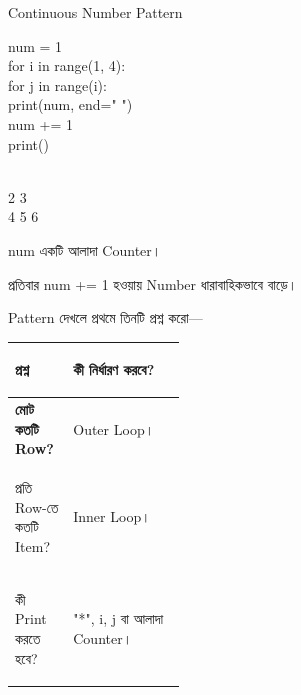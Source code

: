 \begin{codeoutputbox}{Continuous Number Pattern}

\noindent
\begin{minipage}[t]{0.55\linewidth}
\codeheading

\begin{english}
\ttfamily
num = 1\\
for i in range(1, 4):\\
\hspace*{4mm}for j in range(i):\\
\hspace*{8mm}print(num, end=" ")\\
\hspace*{8mm}num += 1\\
\hspace*{4mm}print()
\end{english}

\end{minipage}
\hfill
\begin{minipage}[t]{0.41\linewidth}
\outputheading

\begin{english}
\\
2 3\\
4 5 6
\end{english}

\medskip

\textenglish{\ttfamily num}
একটি আলাদা Counter।

প্রতিবার
\textenglish{\ttfamily num += 1}
হওয়ায় Number ধারাবাহিকভাবে বাড়ে।

\end{minipage}

\end{codeoutputbox}



Pattern দেখলে প্রথমে তিনটি প্রশ্ন করো—

\begin{tabularx}
{\linewidth}
{
|>{\bfseries\RaggedRight\arraybackslash}p{0.34\linewidth}
|Y|
}

\hline
{}

\textbf{প্রশ্ন}
&
\textbf{কী নির্ধারণ করবে?}
\\
\hline

মোট কতটি Row?
&
Outer Loop।
\\
\hline

প্রতি Row-তে কতটি Item?
&
Inner Loop।
\\
\hline

কী Print করতে হবে?
&
\textenglish{\ttfamily "*"},
\textenglish{\ttfamily i},
\textenglish{\ttfamily j}
বা আলাদা Counter।
\\
\hline

\end{tabularx}

